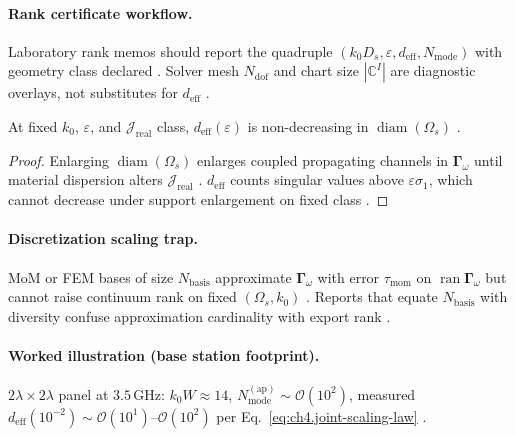 \paragraph{Rank certificate workflow.}
Laboratory rank memos should report the quadruple \((k_{0}D_{s},\varepsilon,d_{\mathrm{eff}},N_{\mathrm{mode}})\) with geometry class declared
\cite{stratton1941,harrington2001,hansen1988,jackson1999}. Solver mesh \(N_{\mathrm{dof}}\) and chart size \(|\mathbb{C}^{I}|\) are diagnostic overlays,
not substitutes for \(d_{\mathrm{eff}}\) \cite{devaney2004,collin2001}.

\begin{theorem}
\label{thm:ch4.diam-rank-monotone}
At fixed \(k_{0}\), \(\varepsilon\), and \(\mathcal{J}_{\mathrm{real}}\) class, \(d_{\mathrm{eff}}(\varepsilon)\) is non-decreasing in \(\operatorname{diam}(\Omega_{s})\)
\cite{stratton1941,hansen1988,harrington2001,jackson1999,devaney2004}.
\end{theorem}
\begin{proof}
Enlarging \(\operatorname{diam}(\Omega_{s})\) enlarges coupled propagating channels in \(\boldsymbol{\Gamma}_\omega\) until material dispersion alters
\(\mathcal{J}_{\mathrm{real}}\) \cite{harrington2001,stratton1941}. \(d_{\mathrm{eff}}\) counts singular values above \(\varepsilon\sigma_{1}\), which cannot
decrease under support enlargement on fixed class \cite{hansen1988,devaney2004,jackson1999}.
\end{proof}

\paragraph{Discretization scaling trap.}
MoM or FEM bases of size \(N_{\mathrm{basis}}\) approximate \(\boldsymbol{\Gamma}_\omega\) with error \(\tau_{\mathrm{mom}}\) on \(\operatorname{ran}\boldsymbol{\Gamma}_\omega\)
but cannot raise continuum rank on fixed \((\Omega_{s},k_{0})\) \cite{harrington2001,devaney2004}. Reports that equate \(N_{\mathrm{basis}}\) with diversity
confuse approximation cardinality with export rank \cite{stratton1941,hansen1988,collin2001}.

\paragraph{Worked illustration (base station footprint).}
\(2\lambda\times2\lambda\) panel at \(3.5\,\mathrm{GHz}\): \(k_{0}W\approx14\), \(N_{\mathrm{mode}}^{\mathrm{(ap)}}\sim\mathcal{O}(10^{2})\), measured
\(d_{\mathrm{eff}}(10^{-2})\sim\mathcal{O}(10^{1})\)--\(\mathcal{O}(10^{2})\) per Eq.~\eqref{eq:ch4.joint-scaling-law} \cite{collin2001,harrington2001,hansen1988,jackson1999}.

